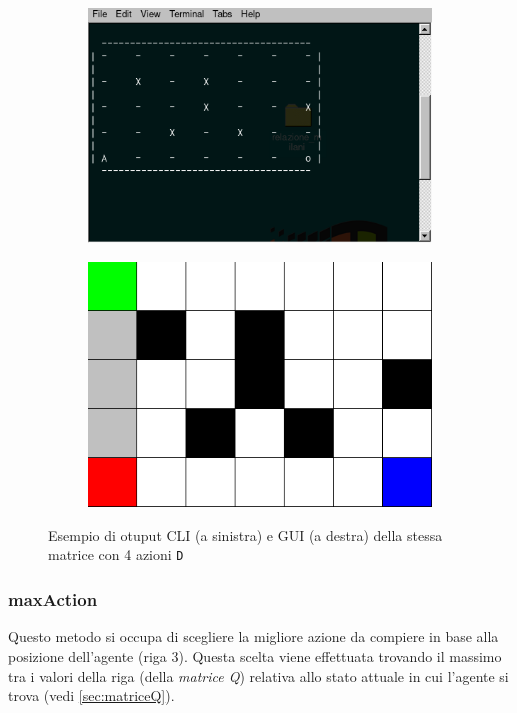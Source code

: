 \begin{figure}[H]
	\centering
	\begin{subfigure}{.5\textwidth}
		\includegraphics[width=.9\linewidth]{img/maze_cli.png}
	\end{subfigure}%
	\begin{subfigure}{.5\textwidth}
		\includegraphics[width=.9\linewidth]{img/maze_gui.png}
	\end{subfigure}%
	\caption{Esempio di otuput CLI (a sinistra) e GUI (a destra) della stessa matrice con 4 azioni \lstinline[style=cmd]|D|}
\end{figure}


\subsubsection{maxAction}
\label{sec:maxaction}

Questo metodo si occupa di scegliere la migliore azione da compiere in base alla posizione dell'agente (riga 3). Questa scelta viene effettuata trovando il massimo tra i valori della riga (della \textit{matrice Q}) relativa allo stato attuale in cui l'agente si trova (vedi \autoref{sec:matriceQ}).\\

